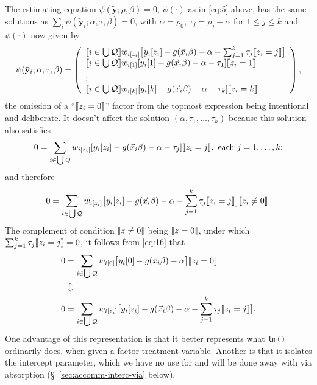 \documentclass{article}
\DeclarePairedDelimiter{\indicator}{\llbracket}{\rrbracket}
\newcommand{\owt}[1][z_i]{\ensuremath{w_{i[#1]}}}
\begin{document}
The estimating equation $\psi(\tilde{\mathbf{y}}; \rho, \beta)=0$,
$\psi(\cdot)$ as in \eqref{eq:5} above, has the same solutions as $\sum_{i}\psi(\tilde{\mathbf{y}}_{i};
  \alpha, \tau, \beta)=0$, with $\alpha=\rho_{0}$, $\tau_{j}=\rho_{j}-\alpha$ for
$1\leq j \leq k$ and $\psi(\cdot)$ now given by 
\begin{equation} \label{eq:14}
         \psi(\tilde{\mathbf{y}}_{i};
  \alpha, \tau, \beta) =
         \left( \begin{array}{l}
           \indicator{i \in \bigcup \mathcal{Q}}\owt{}\big[y_{i}[z_{i}] - g(\vec{x}_{i}\beta)-
                  \alpha - \sum_{j=1}^{k}\tau_{j}\indicator{z_{i}=j}\big]\\
           \indicator{i \in \bigcup \mathcal{Q}}\owt[1][y_{i}[1] - g(\vec{x}_{i}\beta)-
                  \alpha-\tau_{1}]\indicator{z_{i}=1}\\
                  \vdots \\
           \indicator{i \in \bigcup \mathcal{Q}}\owt[k][y_{i}[k] - g(\vec{x}_{i}\beta)-
                 \alpha - \tau_{k}]\indicator{z_{i}=k}\\
                \end{array}\right), 
\end{equation}
the omission of a ``$\indicator{z_{i}=0}$'' factor from the topmost
expression being intentional and deliberate. It doesn't affect the solution
$(\alpha, \tau_{1}, \ldots, \tau_{k})$ because this solution also satisfies
\begin{equation} \label{eq:16}
       0 = \sum_{i \in \bigcup \mathcal{Q}}\owt{}[y_{i}[z_i] - g(\vec{x}_{i}\beta)-
                  \alpha-\tau_{j}]\indicator{z_{i}=j}, \text{ each } j=1, \ldots, k;
\end{equation}
and therefore
\begin{equation*}
       0 = \sum_{i \in \bigcup \mathcal{Q}}\owt{}\big[y_{i}[z_i] - g(\vec{x}_{i}\beta)-
                  \alpha-\sum_{j=1}^{k}\tau_{j}\indicator{z_{i}=j}\big]\indicator{z_{i}
                  \neq 0}.
\end{equation*}
The complement of condition $\indicator{z\neq 0}$ being
$\indicator{z=0}$, under which
$\sum_{j=1}^{k}\tau_{j}\indicator{z_{i}=j}=0$, it follows from \eqref{eq:16} that
\begin{align*}
         0 &= \sum_{i \in \bigcup \mathcal{Q}}\owt[0]\big[y_{i}[0] - g(\vec{x}_{i}\beta)-
                  \alpha\big]\indicator{z_{i}
             =0}\\
           & \Updownarrow \\
         0 &= \sum_{i \in \bigcup \mathcal{Q}}\owt{}\big[y_{i}[z_i] - g(\vec{x}_{i}\beta)-
                  \alpha - \sum_{j=1}^{k}\tau_{j}\indicator{z_{i}=j}\big].
\end{align*}
One advantage of this representation is that it better represents what
\texttt{lm()} ordinarily does, when given a factor treatment
variable.  Another is that it isolates the intercept parameter, which
we have no use for and will be done away with via absorption (\S~\ref{sec:accomm-interc-via} below). 
\end{document}
